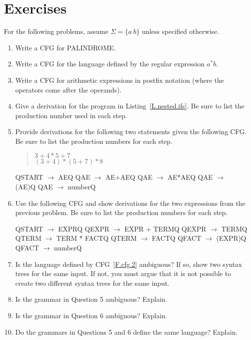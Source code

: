 \documentclass[letterpaper,12pt,openany,reqno]{book}%
\newcommand{\cfgprod}[2] {{\ttfamily #1} $\rightarrow$ {\ttfamily #2}}
\begin{document}
\section{Exercises}
For the following problems, assume $\Sigma = \{a\ b\}$ unless specified otherwise.
\begin{enumerate}
\item Write a CFG for PALINDROME.
\item Write a CFG for the language defined by the regular expression $a^*b$.
\item Write a CFG for arithmetic expressions in postfix notation (where the operators come after the operands).
\item Give a derivation for the program in Listing~\ref{L.nested.ifs}. Be sure to list the production number used in each step.
\item Provide derivations for the following two statements given the following CFG. Be sure to list the production numbers for each step.
\begin{quote}
$3+4*5+7$\\
$(3+4)*(5+7)*8$
\end{quote}
\begin{cfg}{}{}
Q\cfgprod{START}{AE}Q
Q\cfgprod{AE}{AE+AE}Q
Q\cfgprod{AE}{AE*AE}Q
Q\cfgprod{AE}{(AE)}Q
Q\cfgprod{AE}{number}Q
\end{cfg}
\item Use the following CFG and show derivations for the two expressions from the previous problem. Be sure to list the production numbers for each step.
\begin{cfg}{}{}
Q\cfgprod{START}{EXPR}Q
Q\cfgprod{EXPR}{EXPR + TERM}Q
Q\cfgprod{EXPR}{TERM}Q
Q\cfgprod{TERM}{TERM * FACT}Q
Q\cfgprod{TERM}{FACT}Q
Q\cfgprod{FACT}{(EXPR)}Q
Q\cfgprod{FACT}{number}Q
\end{cfg}
\item Is the language defined by CFG~\ref{F.cfg.2} ambiguous? If so, show two syntax trees for the same input. If not, you must argue that it is not possible to create two different syntax trees for the same input.
\item Is the grammar in Question 5 ambiguous? Explain.
\item Is the grammar in Question 6 ambiguous? Explain.
\item Do the grammars in Questions 5 and 6 define the same language? Explain.
\end{enumerate}
\end{document}
